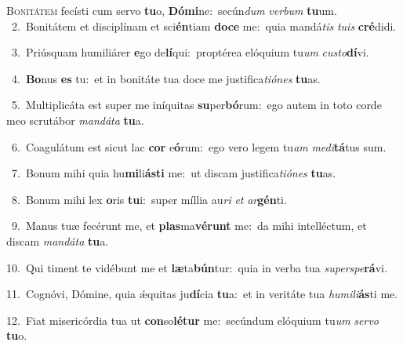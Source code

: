 \lettrine{\initial\textcolor{\initialcolor}{B}}{onitátem} fecísti cum servo \textbf{tu}\-o, \textbf{Dó}\-\textbf{mi}ne:~\star secún\textit{dum} \textit{ver}\-\textit{bum} \textbf{tu}\-um.\\
{\numbfont\textcolor{\numbcolor}{~2.}}~Bonitátem et disciplínam et sci\-\textbf{én}\-tiam \textbf{do}\-\textbf{ce} me:~\star quia mandá\textit{tis} \textit{tu}\-\textit{is} \textbf{cré}\-didi.\par
{\numbfont\textcolor{\numbcolor}{~3.}}~Priúsquam humiliárer \textbf{e}\-go de\-\textbf{lí}\-qui:~\star proptérea elóquium tu\textit{um} \textit{cus}\-\textit{to}\textbf{dí}vi.\par
{\numbfont\textcolor{\numbcolor}{~4.}}~\-\textbf{Bo}\-nus \textbf{es} tu:~\star et in bonitáte tua doce me justifica\-\textit{ti}\-\textit{ó}\textit{nes} \textbf{tu}\-as.\par
{\numbfont\textcolor{\numbcolor}{~5.}}~Multiplicáta est super me iníquitas \textbf{su}\-per\-\textbf{bó}\-rum:~\star ego autem in toto corde meo scrutábor \textit{man}\-\textit{dá}\textit{ta} \textbf{tu}\-a.\par
{\numbfont\textcolor{\numbcolor}{~6.}}~Coagulátum est sicut lac \textbf{cor} e\-\textbf{ó}\-rum:~\star ego vero legem tu\textit{am} \textit{me}\-\textit{di}\textbf{tá}tus sum.\par
{\numbfont\textcolor{\numbcolor}{~7.}}~Bonum mihi quia hu\-\textbf{mi}\-li\-\textbf{ás}\-\textbf{ti} me:~\star ut discam justifica\-\textit{ti}\-\textit{ó}\textit{nes} \textbf{tu}\-as.\par
{\numbfont\textcolor{\numbcolor}{~8.}}~Bonum mihi lex \textbf{o}\-ris \textbf{tu}\-i:~\star super míllia au\textit{ri} \textit{et} \textit{ar}\-\textbf{gén}ti.\par
{\numbfont\textcolor{\numbcolor}{~9.}}~Manus tuæ fecérunt me, et \textbf{plas}\-ma\-\textbf{vé}\-\textbf{runt} me:~\star da mihi intelléctum, et discam \textit{man}\-\textit{dá}\textit{ta} \textbf{tu}\-a.\par
{\numbfont\textcolor{\numbcolor}{10.}}~Qui timent te vidébunt me et \textbf{læ}\-ta\-\textbf{bún}\-tur:~\star quia in verba tua \textit{su}\-\textit{per}\textit{spe}\textbf{rá}vi.\par
{\numbfont\textcolor{\numbcolor}{11.}}~Cognóvi, Dómine, quia ǽquitas ju\-\textbf{dí}\-cia \textbf{tu}\-a:~\star et in veritáte tua \textit{hu}\-\textit{mi}\textit{li}\textbf{ás}ti me.\par
{\numbfont\textcolor{\numbcolor}{12.}}~Fiat misericórdia tua ut \textbf{con}\-so\-\textbf{lé}\-\textbf{tur} me:~\star secúndum elóquium tu\textit{um} \textit{ser}\-\textit{vo} \textbf{tu}\-o.\par
